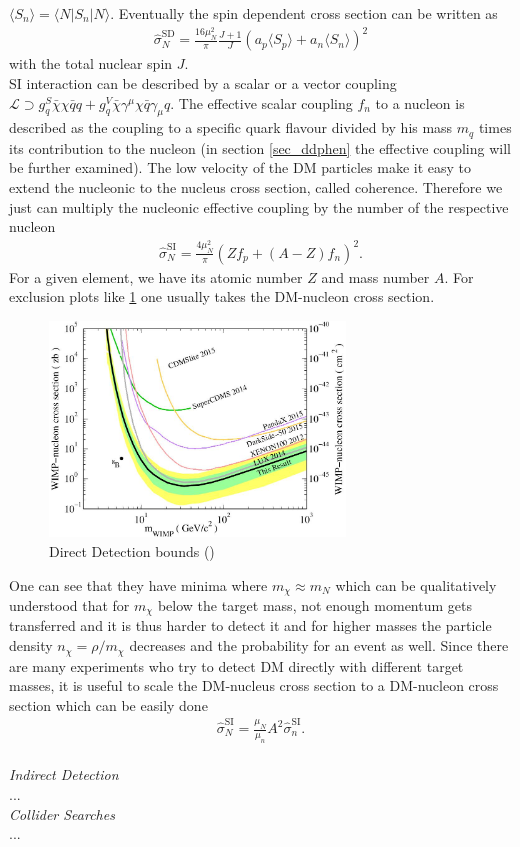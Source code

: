 $\langle S_n\rangle = \langle N|S_n|N\rangle$. Eventually the spin dependent cross section can be written as
\begin{align}
 \hat\sigma_N^\text{SD} = \frac{16\mu_N^2}{\pi} \frac{J+1}{J}\left(a_p \langle S_p\rangle + a_n \langle S_n \rangle\right)^2
 \label{eq_SDsigma}
\end{align}
with the total nuclear spin $J$.\\
\noindent SI interaction can be described by a scalar or a vector coupling 
$\mathcal{L} \supset g_q^S \bar \chi \chi \bar q q + g_q^V \bar \chi \gamma^\mu \chi \bar q \gamma_\mu q$. The effective scalar coupling $f_n$
to a nucleon is described as the coupling to a specific quark flavour divided by his mass $m_q$ times its contribution to the nucleon (in section
\ref{sec_ddphen} the effective coupling will be further examined). The low velocity of the DM particles make it easy to extend the nucleonic to the 
nucleus cross section, called coherence.  Therefore
we just can multiply the nucleonic effective coupling by the number of the respective nucleon
\begin{align}
 \hat\sigma_N^\text{SI} = \frac{4\mu_N^2}{\pi} \left(Z f_p + (A-Z) f_n\right)^2.
 \label{eq_th.sigma.dd}
\end{align}
For a given element, we have its atomic number $Z$ and mass number $A$. For exclusion plots like \ref{pic_ddbounds} one usually takes the 
DM-nucleon cross section. 
\begin{figure}[t]
 \includegraphics[width=0.7\textwidth]{../pics/ddLux.jpeg}
 \caption{Direct Detection bounds (\cite{1512.03506})}
 \label{pic_ddbounds}
\end{figure}
One can see that they have minima where $m_\chi\approx m_N$ which can be qualitatively understood that for $m_\chi$ 
below the target mass, not enough momentum gets transferred and it is thus harder to detect it and for higher masses the particle density $n_\chi=\rho/m_\chi$
decreases and the probability for an event as well. Since there are many experiments who try to detect DM directly with different target masses,
it is useful to scale the DM-nucleus cross section to a DM-nucleon cross section which can be easily done
\begin{align}
 \hat\sigma_N^\text{SI} = \frac{\mu_N}{\mu_n} A^2 \hat\sigma_n^\text{SI}.
\end{align}
\\ \textit{Indirect Detection} \\
\noindent ...
\\ \textit{Collider Searches}\\
\noindent ...